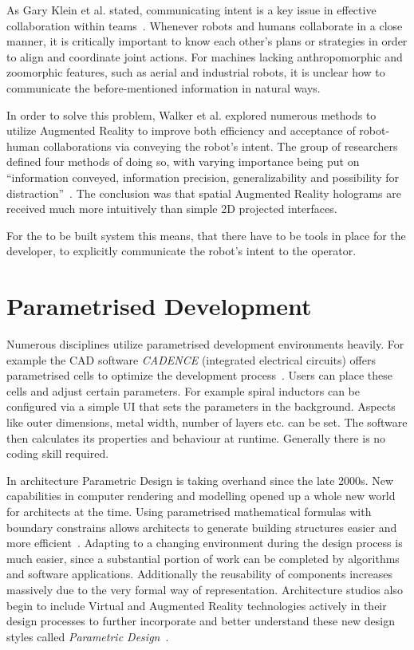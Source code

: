 As Gary Klein et al. stated, communicating intent is a key issue in effective collaboration within teams~\cite{klein2005common}. Whenever robots and humans collaborate in a close manner, it is critically important to know each other’s plans or strategies in order to align and coordinate joint actions. For machines lacking anthropomorphic and zoomorphic features, such as aerial and industrial robots, it is unclear how to communicate the before-mentioned information in natural ways.

In order to solve this problem, Walker et al. \cite{walker2018communicating} explored numerous methods to utilize Augmented Reality to improve both efficiency and acceptance of robot-human collaborations via conveying the robot's intent. The group of researchers defined four methods of doing so, with varying importance being put on “information conveyed, information precision, generalizability and possibility for distraction”~\cite{walker2018communicating}. The conclusion was that spatial Augmented Reality holograms are received much more intuitively than simple 2D projected interfaces.

For the to be built system this means, that there have to be tools in place for the developer, to explicitly communicate the robot's intent to the operator. 

\section{Parametrised Development}\label{Section:ParametricDesignIntoduction}
Numerous disciplines utilize parametrised development environments heavily. For example the CAD software \textit{CADENCE} (integrated electrical circuits) offers parametrised cells to optimize the development process~\cite{parametrizedCellElectricalInductor}. Users can place these cells and adjust certain parameters. For example spiral inductors can be configured via a simple UI that sets the parameters in the background. Aspects like outer dimensions, metal width, number of layers etc. can be set. The software then calculates its properties and behaviour at runtime. Generally there is no coding skill required.

In architecture Parametric Design is taking overhand since the late 2000s. New capabilities in computer rendering and modelling opened up a whole new world for architects at the time. Using parametrised mathematical formulas with boundary constrains allows architects to generate building structures easier and more efficient~\cite{stavric2011parametric}. Adapting to a changing environment during the design process is much easier, since a substantial portion of work can be completed by algorithms and software applications. Additionally the reusability of  components increases massively due to the very formal way of representation. Architecture studios also begin to include Virtual and Augmented Reality technologies actively in their design processes to further incorporate and better understand these new design styles called \textit{Parametric Design}~\cite{seichterDigitalDesignArch, salimSystemArchMR, wangFrameworkMXBIM}. 



